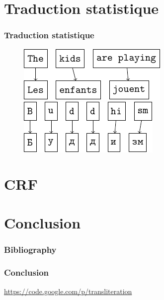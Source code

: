 \documentclass{beamer}
\begin{document}
\section{Traduction statistique}
\begin{frame}
\tableofcontents[currentsection]
\end{frame}
\begin{frame}
    \frametitle{Traduction statistique}
    \begin{figure}[H]
        \label{translation_alignment}
        \centering
        \vspace{0.3cm}
        \includegraphics{word_alignment.pdf}
        \hspace{0.5cm}
        \includegraphics{letter_alignment.pdf}
    \end{figure}
\end{frame}

\section{CRF}
\begin{frame}
\tableofcontents[currentsection]
\end{frame}

\section{Conclusion}
\begin{frame}
\tableofcontents[currentsection]
\end{frame}
\begin{frame}
    \frametitle{Bibliography}
    {\fontsize{0.8em}{1em}
    \nocite{*}
    
    }
\end{frame}

\begin{frame}
    \frametitle{Conclusion}
    \url{https://code.google.com/p/transliteration}
\end{frame}
\end{document}
